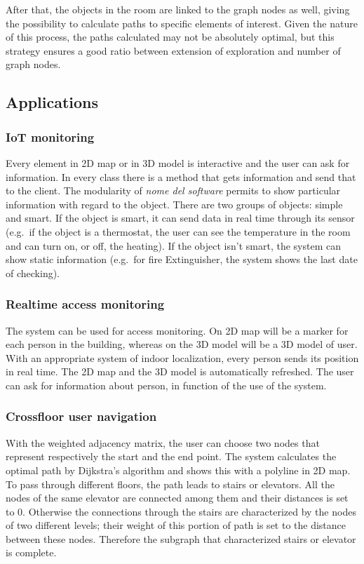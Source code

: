 \documentclass[]{article}
\begin{document}
After that, the objects in the room are linked to the graph nodes as
well, giving the possibility to calculate paths to specific elements of
interest. Given the nature of this process, the paths calculated may not
be absolutely optimal, but this strategy ensures a good ratio between
extension of exploration and number of graph nodes.

\subsection{Applications}\label{applications}

\subsubsection{IoT monitoring}\label{iot-monitoring}

Every element in 2D map or in 3D model is interactive and the user can
ask for information. In every class there is a method that gets
information and send that to the client. The modularity of \emph{nome
del software} permits to show particular information with regard to the
object. There are two groups of objects: simple and smart. If the object
is smart, it can send data in real time through its sensor (e.g.~if the
object is a thermostat, the user can see the temperature in the room and
can turn on, or off, the heating). If the object isn't smart, the system
can show static information (e.g.~for fire Extinguisher, the system
shows the last date of checking).

\subsubsection{Realtime access
monitoring}\label{realtime-access-monitoring}

The system can be used for access monitoring. On 2D map will be a marker
for each person in the building, whereas on the 3D model will be a 3D
model of user. With an appropriate system of indoor localization, every
person sends its position in real time. The 2D map and the 3D model is
automatically refreshed. The user can ask for information about person,
in function of the use of the system.

\subsubsection{Crossfloor user
navigation}\label{crossfloor-user-navigation}

With the weighted adjacency matrix, the user can choose two nodes that
represent respectively the start and the end point. The system
calculates the optimal path by Dijkstra's algorithm and shows this with
a polyline in 2D map. To pass through different floors, the path leads
to stairs or elevators. All the nodes of the same elevator are connected
among them and their distances is set to 0. Otherwise the connections
through the stairs are characterized by the nodes of two different
levels; their weight of this portion of path is set to the distance
between these nodes. Therefore the subgraph that characterized stairs or
elevator is complete.
\end{document}
